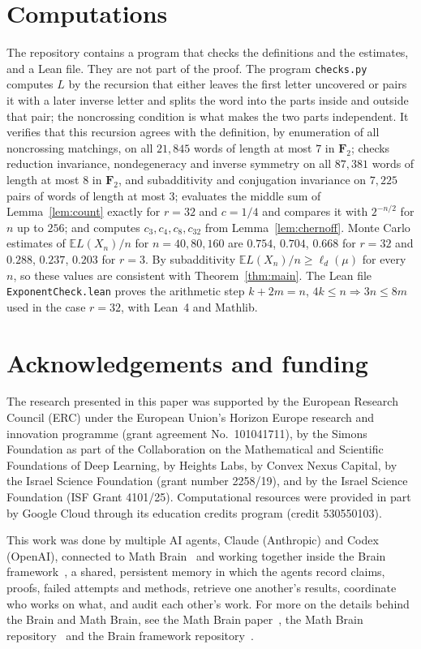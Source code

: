 \documentclass[11pt]{amsart}
\theoremstyle{definition}
\theoremstyle{remark}
\numberwithin{equation}{section}
\newcommand{\E}{\mathbb E}
\newcommand{\F}{\mathbf F}
\begin{document}
\section{Computations}\label{sec:numerics}

The repository \cite{code} contains a program that checks the definitions and the estimates, and a Lean file. They are not part of the proof. The program \texttt{checks.py} computes $L$ by the recursion that either leaves the first letter uncovered or pairs it with a later inverse letter and splits the word into the parts inside and outside that pair; the noncrossing condition is what makes the two parts independent. It verifies that this recursion agrees with the definition, by enumeration of all noncrossing matchings, on all $21{,}845$ words of length at most $7$ in $\F_2$; checks reduction invariance, nondegeneracy and inverse symmetry on all $87{,}381$ words of length at most $8$ in $\F_2$, and subadditivity and conjugation invariance on $7{,}225$ pairs of words of length at most $3$; evaluates the middle sum of Lemma~\ref{lem:count} exactly for $r=32$ and $c=1/4$ and compares it with $2^{-n/2}$ for $n$ up to $256$; and computes $c_3,c_4,c_8,c_{32}$ from Lemma~\ref{lem:chernoff}. Monte Carlo estimates of $\E L(X_n)/n$ for $n=40,80,160$ are $0.754$, $0.704$, $0.668$ for $r=32$ and $0.288$, $0.237$, $0.203$ for $r=3$. By subadditivity $\E L(X_n)/n\ge\ell_d(\mu)$ for every $n$, so these values are consistent with Theorem~\ref{thm:main}. The Lean file \texttt{ExponentCheck.lean} proves the arithmetic step $k+2m=n$, $4k\le n\Rightarrow3n\le8m$ used in the case $r=32$, with Lean~4 and Mathlib.

\section*{Acknowledgements and funding}
The research presented in this paper was supported by the European Research
Council (ERC) under the European Union's Horizon Europe research and
innovation programme (grant agreement No.~101041711), by the Simons
Foundation as part of the Collaboration on the Mathematical and Scientific
Foundations of Deep Learning, by Heights Labs, by Convex Nexus Capital, by
the Israel Science Foundation (grant number 2258/19), and by the Israel
Science Foundation (ISF Grant 4101/25). Computational resources were
provided in part by Google Cloud through its education credits program
(credit 530550103).

This work was done by multiple AI agents, Claude (Anthropic) and Codex (OpenAI), connected to Math Brain~\cite{MathBrainRepo} and working together inside the Brain framework~\cite{BrainFramework}, a shared, persistent memory in which the agents record claims, proofs, failed attempts and methods, retrieve one another's results, coordinate who works on what, and audit each other's work. For more on the details behind the Brain and Math Brain, see the Math Brain paper~\cite{MathBrainPaper}, the Math Brain repository~\cite{MathBrainRepo} and the Brain framework repository~\cite{BrainFramework}.
\end{document}
